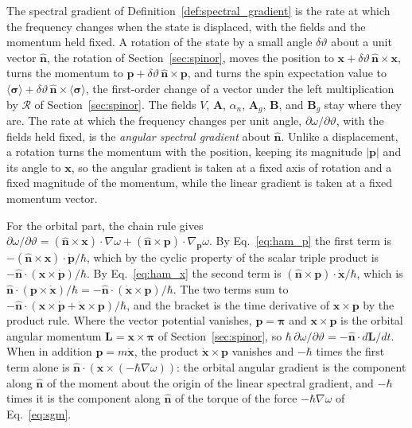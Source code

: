 \documentclass[aps,prd,onecolumn,tightenlines,nofootinbib,notitlepage,11pt,floatfix]{revtex4-2}
\theoremstyle{indentedtheorem}
\begin{document}
The spectral gradient of Definition~\ref{def:spectral_gradient} is the rate at which the frequency changes when the state is displaced, with the fields and the momentum held fixed. A rotation of the state by a small angle $\delta\vartheta$ about a unit vector $\hat{\mathbf{n}}$, the rotation of Section~\ref{sec:spinor}, moves the position to $\mathbf{x}+\delta\vartheta\,\hat{\mathbf{n}}\times\mathbf{x}$, turns the momentum to $\mathbf{p}+\delta\vartheta\,\hat{\mathbf{n}}\times\mathbf{p}$, and turns the spin expectation value to $\langle\boldsymbol{\sigma}\rangle+\delta\vartheta\,\hat{\mathbf{n}}\times\langle\boldsymbol{\sigma}\rangle$, the first-order change of a vector under the left multiplication by $\mathcal{R}$ of Section~\ref{sec:spinor}. The fields $V$, $\mathbf{A}$, $\alpha_n$, $\mathbf{A}_g$, $\mathbf{B}$, and $\mathbf{B}_g$ stay where they are. The rate at which the frequency changes per unit angle, $\partial\omega/\partial\vartheta$, with the fields held fixed, is the \emph{angular spectral gradient} about $\hat{\mathbf{n}}$. Unlike a displacement, a rotation turns the momentum with the position, keeping its magnitude $|\mathbf{p}|$ and its angle to $\mathbf{x}$, so the angular gradient is taken at a fixed axis of rotation and a fixed magnitude of the momentum, while the linear gradient is taken at a fixed momentum vector.

For the orbital part, the chain rule gives $\partial\omega/\partial\vartheta=(\hat{\mathbf{n}}\times\mathbf{x})\cdot\nabla\omega+(\hat{\mathbf{n}}\times\mathbf{p})\cdot\nabla_{\mathbf{p}}\omega$. By Eq.~\eqref{eq:ham_p} the first term is $-(\hat{\mathbf{n}}\times\mathbf{x})\cdot\dot{\mathbf{p}}/\hbar$, which by the cyclic property of the scalar triple product is $-\hat{\mathbf{n}}\cdot(\mathbf{x}\times\dot{\mathbf{p}})/\hbar$. By Eq.~\eqref{eq:ham_x} the second term is $(\hat{\mathbf{n}}\times\mathbf{p})\cdot\dot{\mathbf{x}}/\hbar$, which is $\hat{\mathbf{n}}\cdot(\mathbf{p}\times\dot{\mathbf{x}})/\hbar=-\hat{\mathbf{n}}\cdot(\dot{\mathbf{x}}\times\mathbf{p})/\hbar$. The two terms sum to $-\hat{\mathbf{n}}\cdot(\mathbf{x}\times\dot{\mathbf{p}}+\dot{\mathbf{x}}\times\mathbf{p})/\hbar$, and the bracket is the time derivative of $\mathbf{x}\times\mathbf{p}$ by the product rule. Where the vector potential vanishes, $\mathbf{p}=\boldsymbol{\pi}$ and $\mathbf{x}\times\mathbf{p}$ is the orbital angular momentum $\mathbf{L}=\mathbf{x}\times\boldsymbol{\pi}$ of Section~\ref{sec:spinor}, so $\hbar\,\partial\omega/\partial\vartheta=-\hat{\mathbf{n}}\cdot d\mathbf{L}/dt$. When in addition $\mathbf{p}=m\dot{\mathbf{x}}$, the product $\dot{\mathbf{x}}\times\mathbf{p}$ vanishes and $-\hbar$ times the first term alone is $\hat{\mathbf{n}}\cdot(\mathbf{x}\times(-\hbar\nabla\omega))$: the orbital angular gradient is the component along $\hat{\mathbf{n}}$ of the moment about the origin of the linear spectral gradient, and $-\hbar$ times it is the component along $\hat{\mathbf{n}}$ of the torque of the force $-\hbar\nabla\omega$ of Eq.~\eqref{eq:sgm}.
\end{document}

